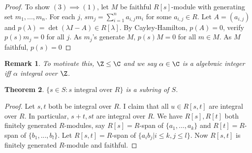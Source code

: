 \documentclass[a4paper,12pt]{article}
\newtheorem{thm}{Theorem}[section]
\newtheorem{rmk}[thm]{Remark}
\begin{document}
\begin{proof}
    To show $(3)\implies (1)$, let $M$ be faithful $R[s]$-module with generating set $m_1,...,m_n$. For each $j$, $sm_j=\sum_{i=1}^n a_{i,j}m_{i}$ for some $a_{i,j}\in R$. Let $A=(a_{i,j})$ and $p(\lambda)=\det(\lambda I -A)\in R[\lambda]$. By Cayley-Hamilton, $p(A)=0$, verify $p(s)m_j=0$ for all $j$. As $m_j$'s generate $M$, $p(s)M=0$ for all $m\in M$. As $M$ faithful, $p(s)=0$
\end{proof}
\begin{rmk}
    To motivate this, $\Z\leq \C$ and we say $\alpha\in \C$ is a algebraic integer iff $\alpha$ integral over $\Z$. 
\end{rmk}
\begin{thm}
    $ \{s\in S: s \text{ integral over }R\}$ is a subring of $S$. 
\end{thm}
\begin{proof}
    Let $s,t$ both be integral over $R$. I claim that all $u\in R[s,t]$ are integral over $R$. In particular, $s+t, st$ are integral over $R$. We have $R[s],R[t]$ both finitely generated $R$-modules, say $R[s]= R$-span of $ \{a_1,...,a_k\}$ and $R[t]= R$-span of $ \{b_1,...,b_l\}$. Let $R[s,t]= R$-span of $ \{a_ib_j | i\leq k, j\leq l\}$. Now $R[s,t]$ is finitely generated $R$-module and faithful. 
\end{proof}
\end{document}
